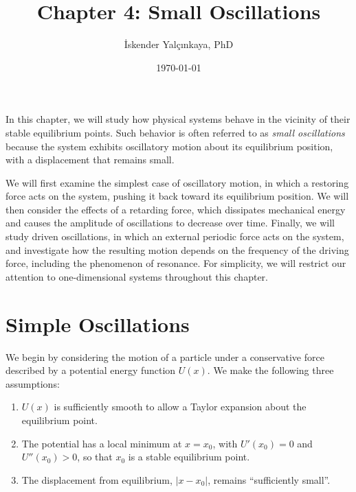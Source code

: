 \documentclass[12pt]{article}
\title{Chapter 4: Small Oscillations}
\author{İskender Yalçınkaya, PhD}
\date{\today}
\begin{document}
\maketitle
In this chapter, we will study how physical systems behave in the vicinity of their stable equilibrium points. Such behavior is often referred to as \textit{small oscillations} because the system exhibits oscillatory motion about its equilibrium position, with a displacement that remains small.

We will first examine the simplest case of oscillatory motion, in which a restoring force acts on the system, pushing it back toward its equilibrium position. We will then consider the effects of a retarding force, which dissipates mechanical energy and causes the amplitude of oscillations to decrease over time. Finally, we will study driven oscillations, in which an external periodic force acts on the system, and investigate how the resulting motion depends on the frequency of the driving force, including the phenomenon of resonance. For simplicity, we will restrict our attention to one-dimensional systems throughout this chapter.

\section{Simple Oscillations}

We begin by considering the motion of a particle under a conservative force described by a potential energy function $U(x)$. We make the following three assumptions:
\begin{enumerate}
    \item[(i)] $U(x)$ is sufficiently smooth to allow a Taylor expansion about the equilibrium point.
    \item[(ii)] The potential has a local minimum at $x=x_0$, with $U'(x_0)=0$ and $U''(x_0)>0$, so that $x_0$ is a stable equilibrium point.
    \item[(iii)] The displacement from equilibrium, $|x-x_0|$, remains ``sufficiently small''.
\end{enumerate}
\end{document}
